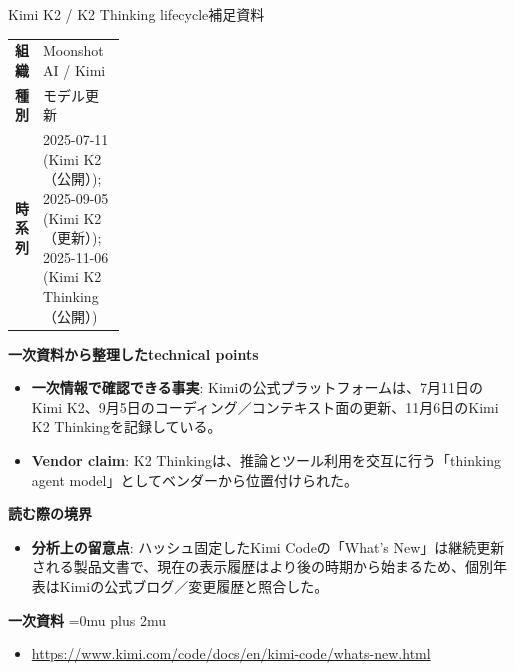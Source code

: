 \begin{technicalnote}{Kimi K2 / K2 Thinking lifecycle}{補足資料}
\begingroup
\begin{tabularx}{\linewidth}{@{}>{\bfseries}p{0.22\linewidth}X@{}}
組織 & Moonshot AI / Kimi \\
種別 & モデル更新 \\
時系列 & 2025-07-11 (Kimi K2（公開）); 2025-09-05 (Kimi K2（更新）); 2025-11-06 (Kimi K2 Thinking（公開）) \\
\end{tabularx}
\smallskip
{\bfseries 一次資料から整理したtechnical points}
\begin{itemize}[leftmargin=1.5em,itemsep=0.35em]
\item \textbf{一次情報で確認できる事実}: Kimiの公式プラットフォームは、7月11日のKimi K2、9月5日のコーディング／コンテキスト面の更新、11月6日のKimi K2 Thinkingを記録している。
\item \textbf{Vendor claim}: K2 Thinkingは、推論とツール利用を交互に行う「thinking agent model」としてベンダーから位置付けられた。
\end{itemize}
\begin{minipage}{\linewidth}
{\bfseries 読む際の境界}
\begin{itemize}[leftmargin=1.5em,itemsep=0.35em]
\item \textbf{分析上の留意点}: ハッシュ固定したKimi Codeの「What's New」は継続更新される製品文書で、現在の表示履歴はより後の時期から始まるため、個別年表はKimiの公式ブログ／変更履歴と照合した。
\end{itemize}
\begin{samepage}
{\bfseries 一次資料}
\begingroup\sloppy
\Urlmuskip=0mu plus 2mu\relax
\begin{itemize}[leftmargin=1.5em,itemsep=0.25em]
\item {\scriptsize\url{https://www.kimi.com/code/docs/en/kimi-code/whats-new.html}}
\end{itemize}
\endgroup
\end{samepage}
\end{minipage}
\endgroup
\end{technicalnote}
\medskip


